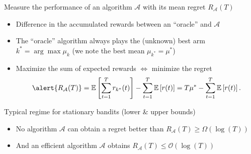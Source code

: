 \documentclass[11pt,english,ignorenonframetext,]{beamer}
\begin{document}
\begin{frame}{Measure the performance of an algorithm $\mathcal{A}$ with its mean regret $R_{\mathcal{A}}(T)$}

\begin{itemize}
  \item
  Difference in the accumulated rewards between an ``oracle'' and $\mathcal{A}$

  \item
  The ``oracle'' algorithm always plays the (unknown) best arm $k^* = \arg\max \mu_k$ (we note the best mean $\mu_{k^*} = \mu^*$)

  \item
  Maximize the sum of expected rewards
  $\Longleftrightarrow$ \alert{minimize the regret}
  \[ \alert{ R_{\mathcal{A}}(T) } = \mathbb{E}\left[ \sum\limits_{t=1}^T r_{k^*}(t) \right] - \sum\limits_{t=1}^T \mathbb{E}\left[ r(t) \right] = T \mu^* - \sum\limits_{t=1}^T \mathbb{E}\left[ r(t) \right]. \]

\end{itemize}

\pause
\vspace*{10pt}

\begin{exampleblock}{Typical regime for stationary bandits (lower \& upper bounds)}
  \begin{itemize}
  \item
  No algorithm $\mathcal{A}$ can obtain a regret better than
  \hfill{}
  $R_{\mathcal{A}}(T) \geq \Omega(\log(T))$

  \item
  And an efficient algorithm $\mathcal{A}$ obtains
  \hfill{}
  $R_{\mathcal{A}}(T) \leq \mathcal{O}(\log(T))$
  \end{itemize}
\end{exampleblock}

\end{frame}
\end{document}
